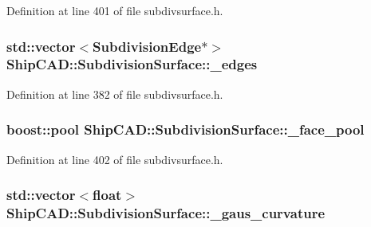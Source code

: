 Definition at line 401 of file subdivsurface.\-h.

\hypertarget{classShipCAD_1_1SubdivisionSurface_a709c44779394f03c06c16adba6187ecd}{
\subsubsection[{\-\_\-edges}]{\setlength{\rightskip}{0pt plus 5cm}std\-::vector$<${\bf Subdivision\-Edge}$\ast$$>$ Ship\-C\-A\-D\-::\-Subdivision\-Surface\-::\-\_\-edges\hspace{0.3cm}{\ttfamily [protected]}}}\label{classShipCAD_1_1SubdivisionSurface_a709c44779394f03c06c16adba6187ecd}


Definition at line 382 of file subdivsurface.\-h.

\hypertarget{classShipCAD_1_1SubdivisionSurface_a2f746c1c19594b1baa03e9c49c9ffd0a}{
\subsubsection[{\-\_\-face\-\_\-pool}]{\setlength{\rightskip}{0pt plus 5cm}boost\-::pool Ship\-C\-A\-D\-::\-Subdivision\-Surface\-::\-\_\-face\-\_\-pool\hspace{0.3cm}{\ttfamily [protected]}}}\label{classShipCAD_1_1SubdivisionSurface_a2f746c1c19594b1baa03e9c49c9ffd0a}


Definition at line 402 of file subdivsurface.\-h.

\hypertarget{classShipCAD_1_1SubdivisionSurface_a20cbcc689f7b2f8af21f502748521185}{
\subsubsection[{\-\_\-gaus\-\_\-curvature}]{\setlength{\rightskip}{0pt plus 5cm}std\-::vector$<$float$>$ Ship\-C\-A\-D\-::\-Subdivision\-Surface\-::\-\_\-gaus\-\_\-curvature\hspace{0.3cm}{\ttfamily [protected]}}}\label{classShipCAD_1_1SubdivisionSurface_a20cbcc689f7b2f8af21f502748521185}


